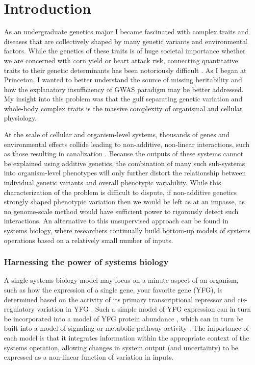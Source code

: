 
\chapter{Introduction\label{ch:intro}}

As an undergraduate genetics major I became fascinated with complex traits and diseases that are collectively shaped by many genetic variants and environmental factors.  While the genetics of these traits is of huge societal importance whether we are concerned with corn yield or heart attack risk, connecting quantitative traits to their genetic determinants has been notoriously difficult \cite{Manolio:2009jp}.  As I began at Princeton, I wanted to better understand the source of missing heritability and how the explanatory insufficiency of GWAS paradigm may be better addressed. My insight into this problem was that the gulf separating genetic variation and whole-body complex traits is the massive complexity of organismal and cellular physiology.

At the scale of cellular and organism-level systems, thousands of genes and environmental effects collide leading to non-additive, non-linear interactions, such as those resulting in canalization \cite{Waddington:1942wy}. Because the outputs of these systems cannot be explained using additive genetics, the combination of many such sub-systems into organism-level phenotypes will only further distort the relationship between individual genetic variants and overall phenotypic variability. While this characterization of the problem is difficult to dispute, if non-additive genetics strongly shaped phenotypic variation then we would be left as at an impasse, as no genome-scale method would have sufficient power to rigorously detect such interactions. An alternative to this unsupervised approach can be found in systems biology, where researchers continually build bottom-up models of systems operations based on a relatively small number of inputs.

\subsection{Harnessing the power of systems biology}

A single systems biology model may focus on a minute aspect of an organism, such as how the expression of a single gene, your favorite gene (YFG), is determined based on the activity of its primary transcriptional repressor and cis-regulatory variation in YFG \cite{Nuzhdin:2012ii}. Such a simple model of YFG expression can in turn be incorporated into a model of YFG protein abundance \cite{Jovanovic:2015hp}, which can in turn be built into a model of signaling or metabolic pathway activity \cite{Neves:2002bk, Chassagnole:2002ty}.  The importance of each model is that it integrates information within the appropriate context of the systems operation, allowing changes in system output (and uncertainty) to be expressed as a non-linear function of variation in inputs.

